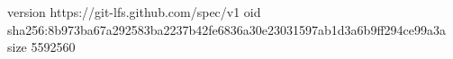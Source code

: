 version https://git-lfs.github.com/spec/v1
oid sha256:8b973ba67a292583ba2237b42fe6836a30e23031597ab1d3a6b9ff294ce99a3a
size 5592560
